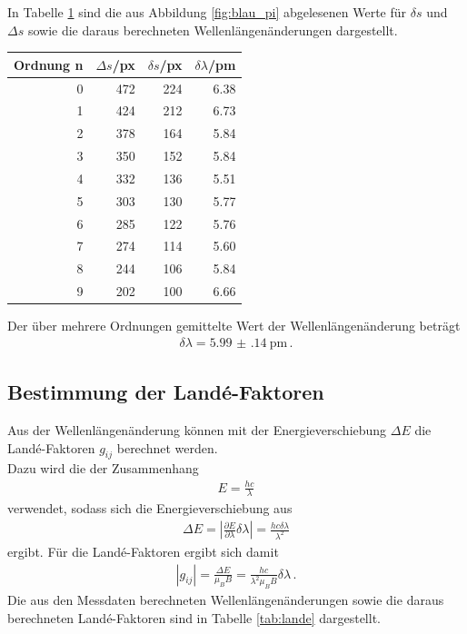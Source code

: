 \documentclass[captions=tableheading]{scrartcl}
\begin{document}
In Tabelle \ref{tab:blaupimessung} sind die aus Abbildung \ref{fig:blau_pi} abgelesenen Werte für $\delta s$ und $\Delta s$ sowie die daraus berechneten Wellenlängenänderungen dargestellt.
\begin{table}[H]
	\centering
	\label{tab:blaupimessung}
	\begin{tabular}{r r r r}
		\toprule
		Ordnung n & $\Delta s$/px & $\delta s$/px & $\delta \lambda$/pm \\
		\midrule
		0 & 472 & 224 & 6.38 \\
		1 & 424 & 212 & 6.73 \\
		2 & 378 & 164 & 5.84 \\
		3 & 350 & 152 & 5.84 \\
		4 & 332 & 136 & 5.51 \\
		5 & 303 & 130 & 5.77 \\
		6 & 285 & 122 & 5.76 \\
		7 & 274 & 114 & 5.60 \\
		8 & 244 & 106 & 5.84 \\
		9 & 202 & 100 & 6.66 \\
		\bottomrule
	\end{tabular}
\end{table}
Der über mehrere Ordnungen gemittelte Wert der Wellenlängenänderung beträgt
\begin{align}
\delta \lambda = \SI{5.99(14)}{\pico\metre}\,.
\end{align}
\subsection{Bestimmung der Landé-Faktoren}
Aus der Wellenlängenänderung können mit der Energieverschiebung $\Delta E$ die Landé-Faktoren $g_{ij}$ berechnet werden. \\
Dazu wird die der Zusammenhang
\begin{align*}
E=\frac{hc}{\lambda}
\end{align*}
verwendet, sodass sich die Energieverschiebung aus
\begin{align}
\Delta E = \left| \frac{\partial E}{\partial \lambda}\delta \lambda\right| = \frac{hc\delta \lambda}{\lambda ^2}
\end{align}
ergibt. Für die Landé-Faktoren ergibt sich damit
\begin{align}
\left| g_{ij}\right| =\frac{\Delta E}{\mu_B B}=\frac{hc}{\lambda ^2\mu_B B}\delta \lambda\,.
\end{align}
Die aus den Messdaten berechneten Wellenlängenänderungen sowie die daraus berechneten Landé-Faktoren sind in Tabelle \ref{tab:lande} dargestellt.
\end{document}
